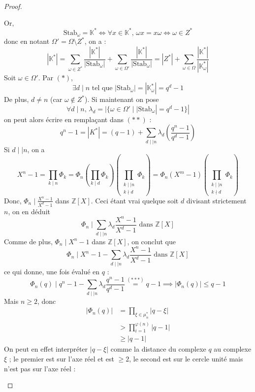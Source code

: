 \begin{proof}
\begin{itemize}
      Or,
      \[ \mathrm{Stab}_\omega = \mathbb{K}^* \iff \forall x \in \mathbb{K}^*, \, \omega x = x \omega \iff \omega \in Z^* \]
      donc en notant $\Omega' = \Omega \setminus Z^*$, on a :
      \[ |\mathbb{K}^*| = \sum_{\omega \in Z^*} \frac{|\mathbb{K}^*|}{|\mathrm{Stab}_\omega|} + \sum_{\omega \in \Omega'} \frac{|\mathbb{K}^*|}{|\mathrm{Stab}_\omega|} = |Z^*| + \sum_{\omega \in \Omega} \frac{|\mathbb{K}^*|}{|\mathbb{K}^*_\omega|} \tag{$**$} \]
      Soit $\omega \in \Omega'$. Par $(*)$,
      \[ \exists d \mid n \text{ tel que } |\mathrm{Stab}_\omega| = |\mathbb{K}^*_\omega| = q^d - 1 \]
      De plus, $d \neq n$ (car $\omega \notin Z^*$). Si maintenant on pose
      \[ \forall d \mid n, \, \lambda_d = |\{ \omega \in \Omega' \mid |\mathrm{Stab}_\omega| = q^d - 1 \}| \]
      on peut alors écrire en remplaçant dans $(**)$ :
      \[ q^n - 1 = |K^*| = (q - 1) + \sum_{d \mid \mid n} \lambda_d \left( \frac{q^n - 1}{q^d - 1} \right) \tag{$***$} \]
      Si $d \mid \mid n$, on a
      \[ X^n-1 = \prod_{k \mid n} \Phi_k = \Phi_n \left ( \prod_{k \mid d} \Phi_k \right ) \left ( \prod_{\substack{k \mid \mid n \\ k \nmid d}} \Phi_k \right ) = \Phi_n (X^m - 1) \left ( \prod_{\substack{k \mid \mid n \\ k \nmid d}} \Phi_k \right ) \]
      Donc, $\Phi_n \mid \frac{X^n - 1}{X^d - 1}$ dans $\mathbb{Z}[X]$. Ceci étant vrai quelque soit $d$ divisant strictement $n$, on en déduit
      \[ \Phi_n \mid \sum_{d \mid \mid n} \lambda_d \frac{X^n - 1}{X^d - 1} \text{ dans } \mathbb{Z}[X] \]
      Comme de plus, $\Phi_n \mid X^n - 1$ dans $\mathbb{Z}[X]$, on conclut que
      \[ \Phi_n \mid X^n - 1 - \sum_{d \mid \mid n} \lambda_d \frac{X^n - 1}{X^d - 1} \text{ dans } \mathbb{Z}[X] \]
      ce qui donne, une fois évalué en $q$ :
      \[ \Phi_n(q) \mid q^n - 1 - \sum_{d \mid \mid n} \lambda_d \frac{q^n - 1}{q^d - 1} \overset{(***)}{=} q-1 \implies |\Phi_n(q)| \leq q-1 \]
      Mais $n \geq 2$, donc
      \begin{align*}
        |\Phi_n(q)| &= \prod_{\xi \in \mu_n^*} |q - \xi| \\
        &> \prod_{i=1}^{\varphi(n)} |q - 1| \\
        &\geq |q-1|
      \end{align*}
      On peut en effet interpréter $|q - \xi|$ comme la distance du complexe $q$ au complexe $\xi$ ; le premier est sur l'axe réel et est $\geq 2$, le second est sur le cercle unité mais n'est pas sur l'axe réel :
      \begin{center}
        \begin{tikzpicture}

\end{tikzpicture}
\end{center}
\end{itemize}
\end{proof}
